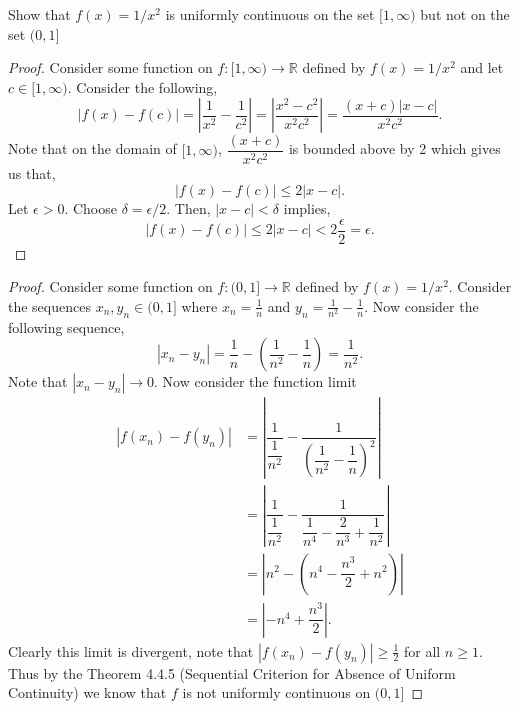 \documentclass[12pt]{article}
\makeatletter
\theoremstyle{homework}
\newenvironment{exercise}[1]
{\def\@currentlabel{#1}\exercisecore}
{\endexercisecore}
\newcommand{\Reals}{\ensuremath{\mathbb R}}
\makeatother
\begin{document}
\begin{exercise}{Abbott 4.4.3} Show that $f(x) = 1/x^2$ is uniformly continuous on the set $[1, \infty)$ but not on the set $(0,1]$\\
  \begin{proof}
    Consider some function on $f: [1, \infty) \to \Reals$  defined by $f(x) = 1/x^2$ and let $c \in [1, \infty)$. Consider the following,
    \begin{equation*}
      |f(x) - f(c)| = |\dfrac{1}{x^2} - \dfrac{1}{c^2}| = |\dfrac{x^2 - c^2}{x^2c^2}| = \dfrac{(x+c)|x - c|}{x^2c^2}. 
    \end{equation*}
    Note that on the domain of $[1, \infty)$, $\dfrac{(x+c)}{x^2c^2}$ is bounded above by 2 which gives us that,
    \begin{equation*}
      |f(x) - f(c)| \le 2|x - c|.
    \end{equation*}
    Let $\epsilon > 0$. Choose $\delta = \epsilon/2$. Then, $|x - c|< \delta$ implies,
    \begin{equation*}
      |f(x) - f(c)| \le 2|x - c| < 2\dfrac{\epsilon}{2} = \epsilon.
    \end{equation*}
  \end{proof} 

  \begin{proof}
    Consider some function on $f: (0,1] \to \Reals$  defined by $f(x) = 1/x^2$. Consider the sequences $x_n,y_n \in (0,1]$ where 
    $x_n = \frac{1}{n}$ and $y_n = \frac{1}{n^2}-\frac{1}{n}$. Now consider the following sequence,
    \begin{equation*}
      |x_n - y_n| = \dfrac{1}{n} - (\dfrac{1}{n^2}-\dfrac{1}{n}) = \dfrac{1}{n^2}.
    \end{equation*} 
    Note that $|x_n - y_n| \to 0$. Now consider the function limit 
    \begin{align*}
      |f(x_n) - f(y_n)| &= |\dfrac{1}{\dfrac{1}{n^2}} - \dfrac{1}{(\dfrac{1}{n^2} - \dfrac{1}{n})^2}|\\
      &= |\dfrac{1}{\dfrac{1}{n^2}} - \dfrac{1}{\dfrac{1}{n^4} - \dfrac{2}{n^3} + \dfrac{1}{n^2}}|\\
      &= |n^2 - (n^4 - \dfrac{n^3}{2} + n^2)|\\
      &= |-n^4 + \dfrac{n^3}{2}|.
    \end{align*}
    Clearly this limit is divergent, note that $|f(x_n) - f(y_n)| \geq \frac{1}{2}$ for all $n \geq 1$. Thus by the Theorem 4.4.5 (Sequential Criterion for Absence of Uniform Continuity) we know that
    $f$ is not uniformly continuous on  $(0,1]$
  \end{proof}
\end{exercise}
\vspace{.5in}
\end{document}
